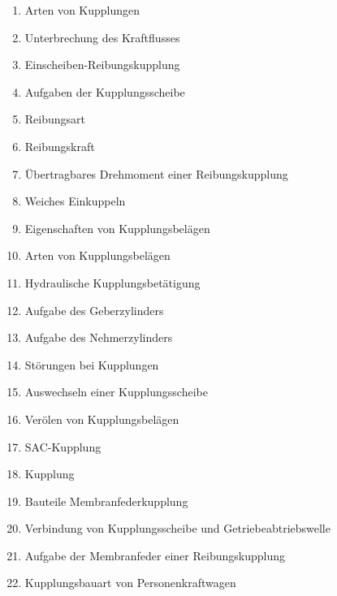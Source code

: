 \begin{enumerate}
\item
  Arten von Kupplungen\\
\item
  Unterbrechung des Kraftflusses\\
\item
  Einscheiben-Reibungskupplung\\
\item
  Aufgaben der Kupplungsscheibe\\
\item
  Reibungsart\\
\item
  Reibungskraft\\
\item
  Übertragbares Drehmoment einer Reibungskupplung\\
\item
  Weiches Einkuppeln\\
\item
  Eigenschaften von Kupplungsbelägen\\
\item
  Arten von Kupplungsbelägen\\
\item
  Hydraulische Kupplungsbetätigung\\
\item
  Aufgabe des Geberzylinders\\
\item
  Aufgabe des Nehmerzylinders\\
\item
  Störungen bei Kupplungen\\
\item
  Auswechseln einer Kupplungsscheibe\\
\item
  Verölen von Kupplungsbelägen\\
\item
  SAC-Kupplung\\
\item
  Kupplung\\
\item
  Bauteile Membranfederkupplung\\
\item
  Verbindung von Kupplungsscheibe und Getriebeabtriebswelle\\
\item
  Aufgabe der Membranfeder einer Reibungskupplung\\
\item
  Kupplungsbauart von Personenkraftwagen\\

\end{enumerate}
